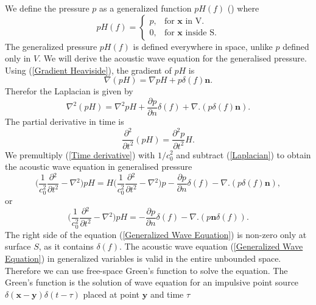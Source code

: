 \documentclass[12pt]{article}
\begin{document}
We define the pressure $p$ as a generalized function $pH(f)$ (\cite{ffowcs1969sound}) where
\begin{equation}\label{Generalized_Functions}
	p H(f) =\begin{cases}
		p , & \text{for $\mathbf{x}$ in V}.     \\
		0,  & \text{for $\mathbf{x}$ inside S}.
	\end{cases}
\end{equation}
The generalized pressure $pH(f)$ is defined everywhere in space, unlike $p$ defined only in $V$. We will derive the acoustic wave equation for the generalised pressure. Using (\ref{Gradient Heaviside}), the gradient of $pH$ is
\begin{equation}
	\nabla (pH) = \nabla p H + p \delta(f)\mathbf{n}.
\end{equation}
Therefor the Laplacian is given by
\begin{equation}\label{Laplacian}
	\nabla^2 (pH) = \nabla^2 p H +  \frac{\partial p}{\partial n}\delta(f) + \nabla.(p \delta(f)\mathbf{n}).
\end{equation}
The partial derivative in time is
\begin{equation}\label{Time derivative}
	\frac{\partial^2}{\partial t^2}(pH) = \frac{\partial^2 p }{\partial t^2}H.
\end{equation}
We premultiply (\ref{Time derivative}) with $1/{c_{0}^2}$ and subtract (\ref{Laplacian}) to obtain the acoustic wave equation in generalised pressure
\begin{equation}
	\Bigg( \frac{1}{c_{0}^2}\frac{\partial{}^{2}}{\partial{t}^{2}}- \nabla{}^{2} \Bigg) pH = H\Bigg( \frac{1}{c_{0}^2}\frac{\partial{}^{2}}{\partial{t}^{2}}- \nabla{}^{2} \Bigg) p - \frac{\partial p}{\partial n}\delta(f) - \nabla.(p \delta(f)\mathbf{n}),
\end{equation}
or
\begin{equation}\label{Generalized Wave Equation}
	\Bigg( \frac{1}{c_{0}^2}\frac{\partial{}^{2}}{\partial{t}^{2}}- \nabla{}^{2} \Bigg) pH = -\frac{\partial p}{\partial n}\delta(f) - \nabla.(p \mathbf{n} \delta(f)).
\end{equation}
The right side of the equation (\ref{Generalized Wave Equation}) is non-zero only at surface $S$, as it contains $\delta (f)$. The acoustic wave equation (\ref{Generalized Wave Equation}) in generalized variables is valid in the entire unbounded space. Therefore we can use free-space Green's function to solve the equation. The Green's function is the solution of wave equation for an impulsive point source $\delta(\mathbf{x} - \mathbf{y})\delta(t - \tau)$ placed at point $\mathbf{y}$ and time $\tau$
\end{document}
